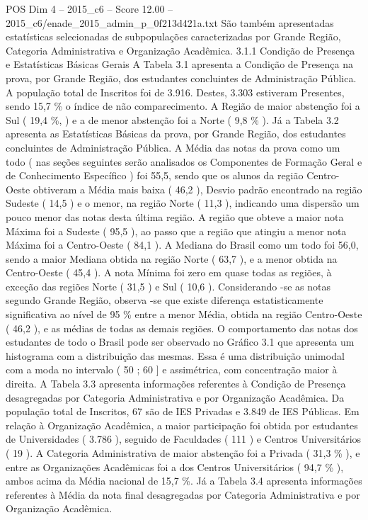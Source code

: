 \begin{textsample}{POS Dim 4 – 2015\_c6 – Score 12.00 – 2015\_c6/enade\_2015\_admin\_p\_0f213d421a.txt}
São também apresentadas estatísticas selecionadas de subpopulações caracterizadas por Grande Região, Categoria Administrativa e Organização Acadêmica. 3.1.1 Condição de Presença e Estatísticas Básicas Gerais A Tabela 3.1 apresenta a Condição de Presença na prova, por Grande Região, dos estudantes concluintes de Administração Pública.
A população total de Inscritos foi de 3.916.
Destes, 3.303 estiveram Presentes, sendo 15,7 \% o índice de não comparecimento.
A Região de maior abstenção foi a Sul ( 19,4 \%, ) e a de menor abstenção foi a Norte ( 9,8 \% ).
Já a Tabela 3.2 apresenta as Estatísticas Básicas da prova, por Grande Região, dos estudantes concluintes de Administração Pública.
A Média das notas da prova como um todo ( nas seções seguintes serão analisados os Componentes de Formação Geral e de Conhecimento Específico ) foi 55,5, sendo que os alunos da região Centro-Oeste obtiveram a Média mais baixa ( 46,2 ), Desvio padrão encontrado na região Sudeste ( 14,5 ) e o menor, na região Norte ( 11,3 ), indicando uma dispersão um pouco menor das notas desta última região.
A região que obteve a maior nota Máxima foi a Sudeste ( 95,5 ), ao passo que a região que atingiu a menor nota Máxima foi a Centro-Oeste ( 84,1 ).
A Mediana do Brasil como um todo foi 56,0, sendo a maior Mediana obtida na região Norte ( 63,7 ), e a menor obtida na Centro-Oeste ( 45,4 ).
A nota Mínima foi zero em quase todas as regiões, à exceção das regiões Norte ( 31,5 ) e Sul ( 10,6 ).
Considerando -se as notas segundo Grande Região, observa -se que existe diferença estatisticamente significativa ao nível de 95 \% entre a menor Média, obtida na região Centro-Oeste ( 46,2 ), e as médias de todas as demais regiões.
O comportamento das notas dos estudantes de todo o Brasil pode ser observado no Gráfico 3.1 que apresenta um histograma com a distribuição das mesmas.
Essa é uma distribuição unimodal com a moda no intervalo ( 50 ; 60 ] e assimétrica, com concentração maior à direita.
A Tabela 3.3 apresenta informações referentes à Condição de Presença desagregadas por Categoria Administrativa e por Organização Acadêmica.
Da população total de Inscritos, 67 são de IES Privadas e 3.849 de IES Públicas.
Em relação à Organização Acadêmica, a maior participação foi obtida por estudantes de Universidades ( 3.786 ), seguido de Faculdades ( 111 ) e Centros Universitários ( 19 ).
A Categoria Administrativa de maior abstenção foi a Privada ( 31,3 \% ), e entre as Organizações Acadêmicas foi a dos Centros Universitários ( 94,7 \% ), ambos acima da Média nacional de 15,7 \%.
Já a Tabela 3.4 apresenta informações referentes à Média da nota final desagregadas por Categoria Administrativa e por Organização Acadêmica.

\end{textsample}
